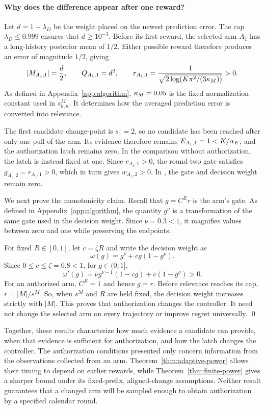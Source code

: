 \paragraph{Why does the difference appear after one reward?}
Let $d=1-\lambda_D$ be the weight placed on the newest prediction error.
The cap $\lambda_D\leq0.999$ ensures that $d\geq10^{-3}$.
Before its first reward, the selected arm $A_1$ has a long-history posterior mean of $1/2$.
Either possible reward therefore produces an error of magnitude $1/2$, giving
\[
|M_{A_1,1}|=\frac d2,
\qquad
Q_{A_1,1}=d^2,
\qquad
r_{A_1,1}
=
\frac{1}{
\sqrt{2\log(K\pi^2/(3\kappa_M))}
}
>0.
\]
As defined in Appendix~\ref{app:algorithm}, $\kappa_M=0.05$ is the fixed normalization constant used in
$s^M_{k,n}$.
It determines how the averaged prediction error is converted into relevance.

The first candidate change-point is $s_1=2$, so no candidate has been reached
after only one pull of the arm.
Its evidence therefore remains $E_{A_1,1}=1<K/\alpha_E$, and the authorization latch remains zero.
In the comparison without authorization, the latch is instead fixed at one.
Since $r_{A_1,1}>0$, the round-two gate satisfies
$g_{A_1,2}=r_{A_1,1}>0$, which in turn gives $w_{A_1,2}>0$.
In \method{}, the gate and decision weight remain zero.

We next prove the monotonicity claim.
Recall that $g=C^E r$ is the arm's
gate.
As defined in Appendix~\ref{app:algorithm}, the quantity $g^\nu$ is a transformation of the same gate used in the decision weight.
Since $\nu=0.3<1$, it magnifies values between zero and one while preserving the endpoints.

For fixed $R\in[0,1]$, let $c=\zeta R$ and write the decision weight as
\[
\omega(g)=g^\nu+cg(1-g^\nu).
\]
Since $0\leq c\leq\zeta=0.8<1$, for $g\in(0,1]$,
\[
\omega'(g)
=
\nu g^{\nu-1}(1-cg)
+c(1-g^\nu)
>0.
\]
For an authorized arm, $C^E=1$ and hence $g=r$.
Before relevance reaches its cap, $r=|M|/s^M$.
So, when $s^M$ and $R$ are held fixed, the decision weight
increases strictly with $|M|$.
This proves that authorization changes the controller.
It need not change the selected arm on every trajectory or improve regret universally. \qed

Together, these results characterize how much evidence a candidate can
provide, when that evidence is sufficient for authorization, and how the latch
changes the controller.
The authorization conditions presented only concern information from the observations
collected from an arm.
Theorem~\ref{thm:adaptive-power} allows their timing to depend on
earlier rewards, while Theorem~\ref{thm:finite-power} gives a sharper
bound under its fixed-prefix, aligned-change assumptions.
Neither result guarantees that a changed arm will be sampled enough
to obtain authorization by a specified calendar round.

